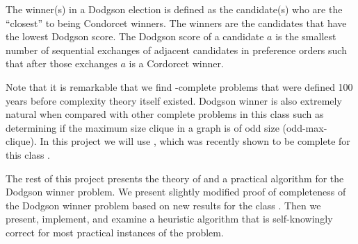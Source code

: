 The winner(s) in a Dodgson election is defined as the candidate(s) who are
the ``closest'' to being Condorcet winners.
The winners are the candidates that have the lowest Dodgson score.
The Dodgson score of a candidate $a$ is the smallest number of
sequential exchanges of adjacent candidates in preference orders such that
after those exchanges $a$ is a Cordorcet winner.

Note that it is remarkable that we find \tp-complete problems that were defined
100 years before complexity theory itself existed.
Dodgson winner is also extremely natural when compared with other complete
problems in this class such as determining if the maximum size clique in a
graph is of odd size (odd-max-clique).
In this project we will use ,
which was recently shown to be complete for this class \citep{compsat}.

The rest of this project presents the theory of and a practical algorithm for
the Dodgson winner problem.
We present slightly modified proof of completeness of
the Dodgson winner problem based on new results for the class \tp.
Then we present, implement, and examine a heuristic algorithm
that is self-knowingly correct for most practical instances of the problem.



